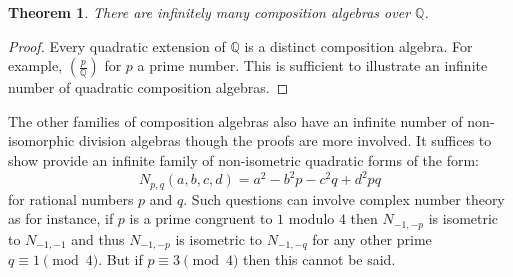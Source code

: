 \documentclass[12pt]{article}
\newcommand{\CayDick}[2]{\left(\frac{#1}{#2}\right)}
\newtheorem{thm}{Theorem}
\begin{document}
\begin{thm}
There are infinitely many composition algebras over $\mathbb{Q}$.
\end{thm}
\begin{proof}
Every quadratic extension of $\mathbb{Q}$ is a distinct composition algebra.  For example,
$\CayDick{p}{\mathbb{Q}}$ for $p$ a prime number.  This is sufficient to illustrate an infinite
number of quadratic composition algebras. 
\end{proof}
The other families of composition algebras also have an infinite number of non-isomorphic 
division algebras though the proofs are more involved.  It suffices to show provide
an infinite family of non-isometric quadratic forms of the form: 
       \[N_{p,q}(a,b,c,d)=a^2-b^2 p-c^2 q+d^2 pq\]
for rational numbers $p$ and $q$.  Such questions can involve complex number theory as
for instance, if $p$ is a prime congruent to $1$ modulo $4$ then
$N_{-1,-p}$ is isometric to $N_{-1,-1}$ and thus $N_{-1,-p}$ is isometric to $N_{-1,-q}$ for
any other prime $q\equiv 1\pmod{4}$.  But if $p\equiv 3\pmod{4}$ then this cannot be said.
\end{document}

